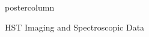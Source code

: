 \documentclass{beamer}
\newcommand*\arcsec{\ensuremath{^{\prime\prime}}}
\begin{document}
\begin{frame}
\begin{columns}[T]
\begin{column}{0.48\textwidth}
\begin{beamercolorbox}[center,wd=\textwidth]{postercolumn}
\begin{block}{HST Imaging and Spectroscopic Data}
\begin{figure}
\begin{minipage}{\textwidth}
              \label{fig:1}
            \end{minipage}
          \end{figure}


\end{block}
\end{beamercolorbox}
\end{column}
\end{columns}
\end{frame}
\end{document}
